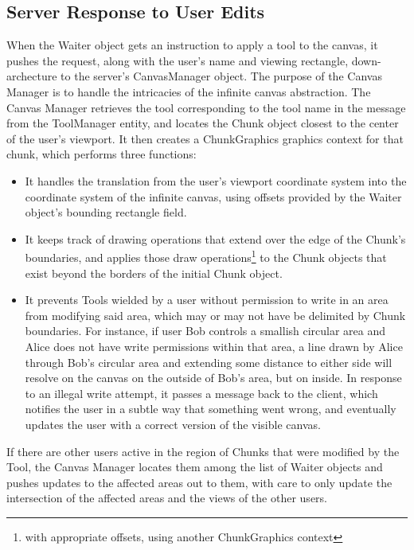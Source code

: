 \documentclass[11pt,oneside,a4paper]{article}
\begin{document}
 \subsection{Server Response to User Edits}
  When the Waiter object gets an instruction to apply a tool to the canvas, it
  pushes the request, along with the user's name and viewing rectangle,
  down-archecture to the server's CanvasManager object. The purpose of the
  Canvas Manager is to handle the intricacies of the infinite canvas abstraction.
  The Canvas Manager retrieves the tool corresponding to the tool name in the
  message from the ToolManager entity, and locates the Chunk object closest to
  the center of the user's viewport. It then creates a ChunkGraphics graphics
  context for that chunk, which performs three functions:
  \begin{itemize}
   \item
    It handles the translation from the user's viewport coordinate system into
    the coordinate system of the infinite canvas, using offsets provided by the
    Waiter object's bounding rectangle field.
   \item
    It keeps track of drawing operations that extend over the edge of the
    Chunk's boundaries, and applies those draw operations\footnote{with appropriate
    offsets, using another ChunkGraphics context} to the Chunk objects that exist
    beyond the borders of the initial Chunk object.
   \item
    It prevents Tools wielded by a user without permission to write in an area
    from modifying said area, which may or may not have be delimited by Chunk
    boundaries. For instance, if user Bob controls a smallish circular area and
    Alice does not have write permissions within that area, a line drawn by Alice
    through Bob's circular area and extending some distance to either side will
    resolve on the canvas on the outside of Bob's area, but on inside. In response
    to an illegal write attempt, it passes a message back to the client, which
    notifies the user in a subtle way that something went wrong, and eventually
    updates the user with a correct version of the visible canvas.
  \end{itemize}
  If there are other users active in the region of Chunks that were modified
  by the Tool, the Canvas Manager locates them among the list of Waiter objects
  and pushes updates to the affected areas out to them, with care to only update
  the intersection of the affected areas and the views of the other users.
\end{document}
